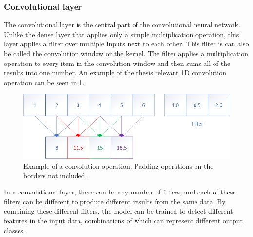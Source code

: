\subsubsection{Convolutional layer}
The convolutional layer is the central part of the convolutional neural network.
Unlike the dense layer that applies only a simple multiplication operation, this layer applies a filter over multiple inputs next to each other. 
This filter is can also be called the convolution window or the kernel.
The filter applies a multiplication operation to every item in the convolution window and then sums all of the results into one number.
An example of the thesis relevant 1D convolution operation can be seen in \cref{fig:conv_example}.

\begin{figure}[htbp]  %
  \centering
  \includegraphics[width=.9\textwidth]{figures/conv_op.png}
  \caption{Example of a convolution operation. Padding operations on the borders not included.}
  \label{fig:conv_example}
\end{figure}

In a convolutional layer, there can be any number of filters, and each of these filters can be different to produce different results from the same data.
By combining these different filters, the model can be trained to detect different features in the input data, combinations of which can represent different output classes.


